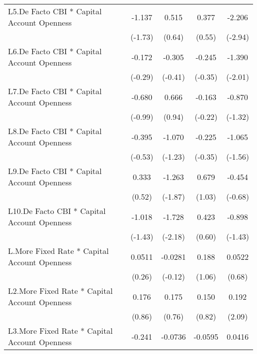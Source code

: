 {\begin{longtable}{l*{4}{c}}
\addlinespace
L5.De Facto CBI * Capital Account Openness&   -1.137         &    0.515         &    0.377         &   -2.206\sym{**} \\
                &  (-1.73)         &   (0.64)         &   (0.55)         &  (-2.94)         \\
\addlinespace
L6.De Facto CBI * Capital Account Openness&   -0.172         &   -0.305         &   -0.245         &   -1.390\sym{*}  \\
                &  (-0.29)         &  (-0.41)         &  (-0.35)         &  (-2.01)         \\
\addlinespace
L7.De Facto CBI * Capital Account Openness&   -0.680         &    0.666         &   -0.163         &   -0.870         \\
                &  (-0.99)         &   (0.94)         &  (-0.22)         &  (-1.32)         \\
\addlinespace
L8.De Facto CBI * Capital Account Openness&   -0.395         &   -1.070         &   -0.225         &   -1.065         \\
                &  (-0.53)         &  (-1.23)         &  (-0.35)         &  (-1.56)         \\
\addlinespace
L9.De Facto CBI * Capital Account Openness&    0.333         &   -1.263         &    0.679         &   -0.454         \\
                &   (0.52)         &  (-1.87)         &   (1.03)         &  (-0.68)         \\
\addlinespace
L10.De Facto CBI * Capital Account Openness&   -1.018         &   -1.728\sym{*}  &    0.423         &   -0.898         \\
                &  (-1.43)         &  (-2.18)         &   (0.60)         &  (-1.43)         \\
\addlinespace
L.More Fixed Rate * Capital Account Openness&   0.0511         &  -0.0281         &    0.188         &   0.0522         \\
                &   (0.26)         &  (-0.12)         &   (1.06)         &   (0.68)         \\
\addlinespace
L2.More Fixed Rate * Capital Account Openness&    0.176         &    0.175         &    0.150         &    0.192\sym{*}  \\
                &   (0.86)         &   (0.76)         &   (0.82)         &   (2.09)         \\
\addlinespace
L3.More Fixed Rate * Capital Account Openness&   -0.241         &  -0.0736         &  -0.0595         &   0.0416         \\

\end{longtable}}
